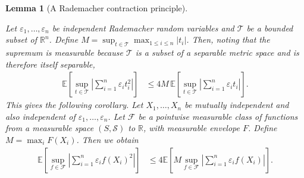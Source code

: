 \documentclass[11pt,lof]{puthesis}
\newcommand{\R}{\ensuremath{\mathbb{R}}}
\newcommand{\E}{\ensuremath{\mathbb{E}}}
\newcommand{\cF}{\ensuremath{\mathcal{F}}}
\newcommand{\cS}{\ensuremath{\mathcal{S}}}
\newcommand{\cT}{\ensuremath{\mathcal{T}}}
\theoremstyle{break}
\newtheorem{lemma}{Lemma}[section]
\theoremstyle{proof}
\begin{document}
\begin{lemma}[A Rademacher contraction principle]
  \label{lem:kernel_app_contraction}

  Let $\varepsilon_1, \ldots, \varepsilon_n$
  be independent Rademacher random variables
  and $\cT$ be a bounded subset of $\R^n$.
  Define
  $M = \sup_{t \in \cT} \max_{1 \leq i \leq n} |t_i|$.
  Then, noting that the supremum is measurable
  because $\cT$ is a subset of a separable metric space
  and is therefore itself separable,
  \begin{align*}
    \E
    \left[
      \sup_{t \in \cT}
      \left|
        \sum_{i=1}^n
        \varepsilon_i
        t_i^2
      \right|
    \right]
    &\leq
    4M \,
    \E
    \left[
      \sup_{t \in \cT}
      \left|
        \sum_{i=1}^n
        \varepsilon_i
        t_i
      \right|
    \right].
  \end{align*}
  This gives the following corollary.
  Let $X_1, \ldots, X_n$ be mutually independent
  and also independent of $\varepsilon_1, \ldots, \varepsilon_n$.
  Let $\cF$ be a pointwise measurable class of functions
  from a measurable space $(S, \cS)$ to $\R$,
  with measurable envelope $F$.
  Define $M = \max_i F(X_i)$.
  Then we obtain
  \begin{align*}
    \E
    \left[
      \sup_{f \in \cF}
      \left|
        \sum_{i=1}^n
        \varepsilon_i
        f(X_i)^2
      \right|
    \right]
    &\leq
    4
    \E
    \left[
      M
      \sup_{f \in \cF}
      \left|
        \sum_{i=1}^n
        \varepsilon_i
        f(X_i)
      \right|
    \right].
  \end{align*}

\end{lemma}
\end{document}
